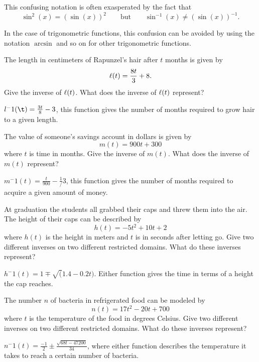 This confusing notation is often exasperated by the fact that 
\[
\sin^2(x) = (\sin(x))^2\qquad \text{but} \qquad \sin^{-1}(x)
\ne(\sin(x))^{-1}.
\]

In the case of trigonometric functions, this confusion can be avoided
by using the notation $\arcsin$ and so on for other trigonometric
functions.




\begin{exercises}

\begin{exercise}
The length in centimeters of Rapunzel's hair after $t$ months is given
by
\[
\ell(t) = \frac{8t}{3}+8.
\]
Give the inverse of $\ell(t)$.  What does the inverse of $\ell(t)$
 represent?
\begin{answer}
$l^-1(\t) = \frac{3t}{8} - 3$, this function gives the number of months
  required to grow hair to a given length. 
\end{answer}
\end{exercise}

\begin{exercise}
The value of someone's savings account in dollars is given by
\[
m(t) = 900t + 300
\]
where $t$ is time in months. Give the inverse of $m(t)$.  What does 
the inverse of $m(t)$ represent?
\begin{answer}
$m^-1(t) = \frac{t}{900} - \frac{1}/{3}$, this function gives the number of months
  required to acquire a given amount of money. 
\end{answer}
\end{exercise}

\begin{exercise}
At graduation the students all grabbed their caps and threw them into
the air.  The height of their caps can be described by 
\[
h(t) = -5t^2+10t+2
\]
where $h(t)$ is the height in meters and $t$ is in seconds after
letting go. Give two different inverses on two different restricted
domains. What do these inverses represent?
\begin{answer}
$h^-1(t) = 1 \mp \sqrt(1.4-0.2t)$.  Either function gives the time in terms of 
a height the cap reaches.
\]
\end{answer}
\end{exercise}

\begin{exercise}
The number $n$ of bacteria in refrigerated food can be modeled by
\[
n(t) =17t^2 - 20t + 700
\]
where $t$ is the temperature of the food in degrees Celsius.  Give two
different inverses on two different restricted domains. What do these
inverses represent?
\begin{answer}
$n^-1(t)= \frac{-1}{2} \pm \frac{\sqrt{68t-47200}}{34}$, where either function 
describes the temperature it takes to reach a certain number of bacteria.
\end{answer}
\end{exercise}



\end{exercises}
